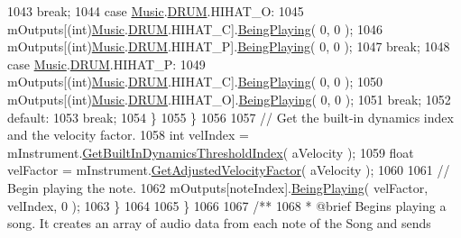 \begin{DoxyCodeInclude}
1043                         \textcolor{keywordflow}{break};
1044                     \textcolor{keywordflow}{case} \hyperlink{class_music}{Music}.\hyperlink{group___music_enums_gade475b4382c7066d1af13e7c13c029b6}{DRUM}.HIHAT\_O:
1045                         mOutputs[(int)\hyperlink{class_music}{Music}.\hyperlink{group___music_enums_gade475b4382c7066d1af13e7c13c029b6}{DRUM}.HIHAT\_C].\hyperlink{group___n_o_o_pub_func_ga2bdaa2787408f353f71ef6c6a18e9285}{BeingPlaying}( 0, 0 );
1046                         mOutputs[(int)\hyperlink{class_music}{Music}.\hyperlink{group___music_enums_gade475b4382c7066d1af13e7c13c029b6}{DRUM}.HIHAT\_P].\hyperlink{group___n_o_o_pub_func_ga2bdaa2787408f353f71ef6c6a18e9285}{BeingPlaying}( 0, 0 );
1047                         \textcolor{keywordflow}{break};
1048                     \textcolor{keywordflow}{case} \hyperlink{class_music}{Music}.\hyperlink{group___music_enums_gade475b4382c7066d1af13e7c13c029b6}{DRUM}.HIHAT\_P:
1049                         mOutputs[(int)\hyperlink{class_music}{Music}.\hyperlink{group___music_enums_gade475b4382c7066d1af13e7c13c029b6}{DRUM}.HIHAT\_C].\hyperlink{group___n_o_o_pub_func_ga2bdaa2787408f353f71ef6c6a18e9285}{BeingPlaying}( 0, 0 );
1050                         mOutputs[(int)\hyperlink{class_music}{Music}.\hyperlink{group___music_enums_gade475b4382c7066d1af13e7c13c029b6}{DRUM}.HIHAT\_O].\hyperlink{group___n_o_o_pub_func_ga2bdaa2787408f353f71ef6c6a18e9285}{BeingPlaying}( 0, 0 );
1051                         \textcolor{keywordflow}{break};
1052                     \textcolor{keywordflow}{default}:
1053                         \textcolor{keywordflow}{break};
1054                 \}
1055             \}
1056 
1057             \textcolor{comment}{// Get the built-in dynamics index and the velocity factor.}
1058             \textcolor{keywordtype}{int} velIndex = mInstrument.\hyperlink{group___v_i_base_pub_func_gacddf07c08c3a8154a6934be22f539788}{GetBuiltInDynamicsThresholdIndex}( 
      aVelocity );
1059             \textcolor{keywordtype}{float} velFactor = mInstrument.\hyperlink{group___v_i_base_pub_func_gae638c68bd0e79d0b99495be69e50f49d}{GetAdjustedVelocityFactor}( aVelocity );
1060 
1061             \textcolor{comment}{// Begin playing the note.}
1062             mOutputs[noteIndex].\hyperlink{group___n_o_o_pub_func_ga2bdaa2787408f353f71ef6c6a18e9285}{BeingPlaying}( velFactor, velIndex, 0 );
1063         \}
1064 
1065     \}
1066 \textcolor{comment}{}
1067 \textcolor{comment}{    /** }
1068 \textcolor{comment}{     * @brief Begins playing a song. It creates an array of audio data from each note of the Song and sends
}
\end{DoxyCodeInclude}
